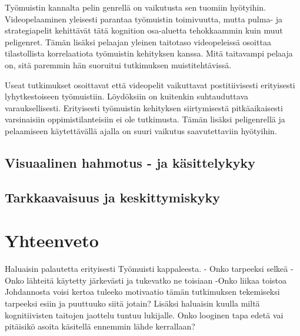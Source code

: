 \documentclass[utf8,bachelor]{gradu3}
\begin{document}
Työmuistin kannalta pelin genrellä on vaikutusta sen tuomiin hyötyihin. Videopelaaminen yleisesti parantaa työmuistin toimivuutta, mutta pulma- ja strategiapelit kehittävät tätä kognition osa-aluetta tehokkaammin kuin muut peligenret.  Tämän lisäksi pelaajan yleinen taitotaso videopeleissä osoittaa tilastollista korrelaatiota työmuistin kehityksen kanssa. Mitä taitavampi pelaaja on, sitä paremmin hän suoruitui tutkimuksen muistitehtävissä. \parencite {zioga2024validation} 

Useat tutkimukset osoittavat että videopelit vaikuttavat postitiivisesti erityisesti lyhytkestoiseen työmuistiin. Löydöksiin on kuitenkin suhtauduttava varauksellisesti. Erityisesti työmuistin kehityksen siirtymisestä pitkäaikaisesti varsinaisiin oppimistilanteisiin ei ole tutkimusta. Tämän lisäksi peligenrellä ja pelaamiseen käytettävällä ajalla on suuri vaikutus saavutettaviin hyötyihin.   

\section{Visuaalinen hahmotus - ja käsittelykyky}

\section{Tarkkaavaisuus ja keskittymiskyky}


\chapter{Yhteenveto}

Haluaisin palautetta erityisesti Työmuisti kappaleesta. - Onko tarpeeksi selkeä -Onko lähteitä
käytetty järkevästi ja tukevatko ne toisiaan -Onko liikaa toistoa
Johdannosta voisi kertoa tuleeko motivaatio tämän tutkimuksen tekemiseksi tarpeeksi esiin
ja puuttuuko siitä jotain?
Lisäksi haluaisin kuulla miltä kognitiivisten taitojen jaottelu tuntuu lukijalle. Onko looginen tapa edetä vai pitäisikö asoita käsitellä ennemmin lähde kerrallaan?

\printbibliography
\end{document}
